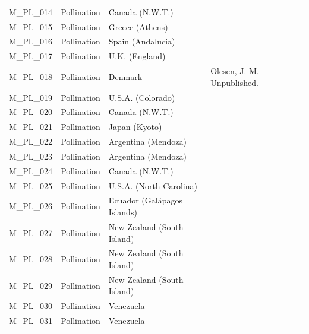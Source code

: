 \documentclass[12pt]{article}
\begin{document}
\begin{spacing}{1.5}
\begin{table}[!h]
\begin{center}
\begin{tabular}{|l l l m{8cm} |}
    M\_PL\_014  & Pollination & Canada (N.W.T.) & \citet{Hocking1968} \\
    M\_PL\_015  & Pollination & Greece (Athens) & \citet{Petanidou1991} \\
    M\_PL\_016  & Pollination & Spain (Andalucia) & \citet{Herrera1988} \\
    M\_PL\_017  & Pollination & U.K. (England) & \citet{Memmott2002} \\
    M\_PL\_018  & Pollination & Denmark & Olesen, J. M. Unpublished.  \\
    M\_PL\_019  & Pollination & U.S.A. (Colorado) & \citet{Inouye1988}  \\
    M\_PL\_020  & Pollination & Canada (N.W.T.) & \citet{Kevan1970} \\
    M\_PL\_021  & Pollination & Japan (Kyoto) & \citet{Kato1990}  \\
    M\_PL\_022  & Pollination & Argentina (Mendoza) & \citet{Medan2002} \\
    M\_PL\_023  & Pollination & Argentina (Mendoza) & \citet{Medan2002} \\
    M\_PL\_024  & Pollination & Canada (N.W.T.) & \citet{Mosquin1967} \\
    M\_PL\_025  & Pollination & U.S.A. (North Carolina) & \citet{Motten1982}  \\
    M\_PL\_026  & Pollination & Ecuador (Gal\'{a}pagos Islands) & \citet{McMullen1993}  \\
    M\_PL\_027  & Pollination & New Zealand (South Island) & \citet{Primack1983} \\
    M\_PL\_028  & Pollination & New Zealand (South Island) & \citet{Primack1983} \\
    M\_PL\_029  & Pollination & New Zealand (South Island) & \citet{Primack1983} \\
    M\_PL\_030  & Pollination & Venezuela & \citet{Ramirez1992} \\
    M\_PL\_031  & Pollination & Venezuela & \citet{Ramirez1989} \\
    \hline
    \end{tabular}
    \end{center}
    \end{table}

    \clearpage
    \newpage


\end{spacing}
\end{document}
